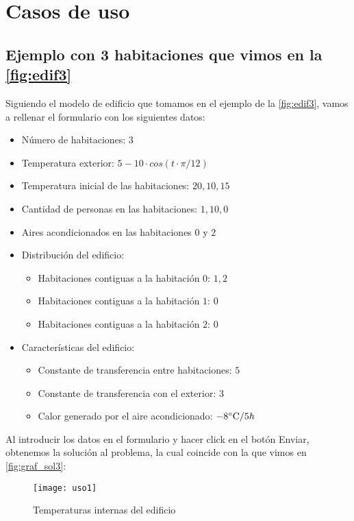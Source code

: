 \section{Casos de uso}
\subsection{Ejemplo con 3 habitaciones que vimos en la \autoref{fig:edif3}}
Siguiendo el modelo de edificio que tomamos en el ejemplo de la \autoref{fig:edif3}, vamos a rellenar el formulario con los siguientes datos:
\begin{itemize}
	\item Número de habitaciones: $3$
	\item Temperatura exterior: $5 - 10\cdot cos(t\cdot \pi/12)$
	\item Temperatura inicial de las habitaciones: $20,10,15$
	\item Cantidad de personas en las habitaciones: $1,10,0$
	\item Aires acondicionados en las habitaciones $0$ y $2$
	\item Distribución del edificio: 
	\begin{itemize}
		\item Habitaciones contiguas a la habitación $0$: $1,2$
		\item Habitaciones contiguas a la habitación $1$: $0$
		\item Habitaciones contiguas a la habitación $2$: $0$
	\end{itemize}
	\item Características del edificio:
	\begin{itemize}
		\item Constante de transferencia entre habitaciones: $5$
		\item Constante de transferencia con el exterior: $3$
		\item Calor generado por el aire acondicionado: $-8\celsius / 5h$
	\end{itemize}
\end{itemize}
Al introducir los datos en el formulario y hacer click en el botón Enviar, obtenemos la solución al problema, la cual coincide con la que vimos en \autoref{fig:graf_sol3}:
\begin{figure}[h!]
	\centering
	\texttt{[image: uso1]}
	\caption{Temperaturas internas del edificio}
	\label{fig:caso1}
\end{figure}
